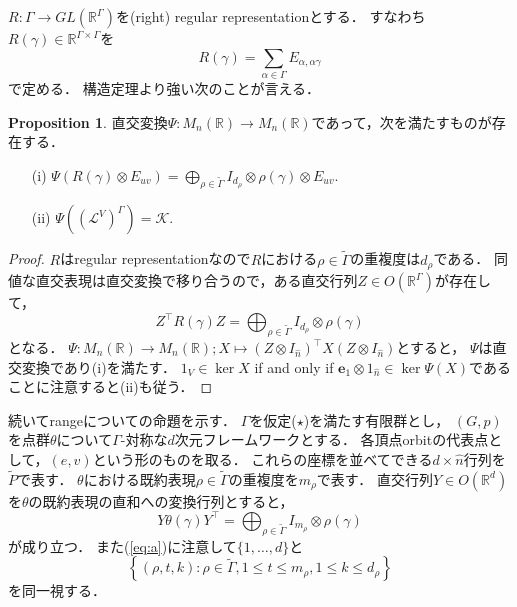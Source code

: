 \documentclass[11pt]{article}
\theoremstyle{definition}
\newtheorem{prop}[defi]{Proposition}
\begin{document}
    $R:\Gamma \rightarrow GL(\mathbb{R}^\Gamma)$を(right) regular representationとする．
    すなわち$R(\gamma) \in \mathbb{R}^{\Gamma \times \Gamma}$を
    \[
        R(\gamma) = \sum_{\alpha \in \Gamma} E_{\alpha,\alpha\gamma} 
    \]
    で定める．
    構造定理より強い次のことが言える．
    \begin{prop} \label{prop:3}
        直交変換$\Psi:M_n(\mathbb{R}) \rightarrow M_n(\mathbb{R})$であって，次を満たすものが存在する．
        \begin{itemize}
            \item[(i)] $\Psi(R(\gamma) \otimes E_{uv}) = \bigoplus_{\rho \in \tilde{\Gamma}} I_{d_\rho} \otimes \rho(\gamma) \otimes E_{uv}$.
            \item[(ii)] $\Psi((\mathcal{L}^V)^\Gamma) = \mathcal{K}$.
        \end{itemize}
    \end{prop}
    \begin{proof}
        $R$はregular representationなので$R$における$\rho \in \tilde{\Gamma}$の重複度は$d_\rho$である．
        同値な直交表現は直交変換で移り合うので，ある直交行列$Z \in O(\mathbb{R}^\Gamma)$が存在して，
        \[
            Z^\top R(\gamma) Z = \bigoplus_{\rho \in \tilde{\Gamma}} I_{d_\rho} \otimes \rho(\gamma)
        \]
        となる．
        $\Psi:M_n(\mathbb{R}) \rightarrow M_n(\mathbb{R}); X \mapsto (Z \otimes I_{\hat{n}})^\top X (Z \otimes I_{\hat{n}})$とすると，
        $\Psi$は直交変換であり(i)を満たす．
        $1_V \in \ker X$ if and only if $\bm{e}_1 \otimes 1_{\hat{n}} \in \ker \Psi(X)$であることに注意すると(ii)も従う．
    \end{proof}
    続いてrangeについての命題を示す．
    $\Gamma$を仮定($\star$)を満たす有限群とし，
    $(G,p)$を点群$\theta$について$\Gamma$-対称な$d$次元フレームワークとする．
    各頂点orbitの代表点として，$(e,v)$という形のものを取る．
    これらの座標を並べてできる$d \times \hat{n}$行列を$\tilde{P}$で表す．
    $\theta$における既約表現$\rho \in \tilde{\Gamma}$の重複度を$m_\rho$で表す．
    直交行列$Y \in O(\mathbb{R}^d)$を$\theta$の既約表現の直和への変換行列とすると，
    \begin{equation} \label{eq:f}
        Y \theta(\gamma) Y^\top = \bigoplus_{\rho \in \tilde{\Gamma}} I_{m_\rho} \otimes \rho(\gamma)
    \end{equation}
    が成り立つ．
    また(\ref{eq:a})に注意して$\{1,\ldots,d\}$と
    \[
        \left\{ (\rho,t,k) : \rho \in \tilde{\Gamma}, 1 \leq t \leq m_\rho, 1 \leq k \leq d_\rho \right\}
    \]
    を同一視する．
\end{document}

